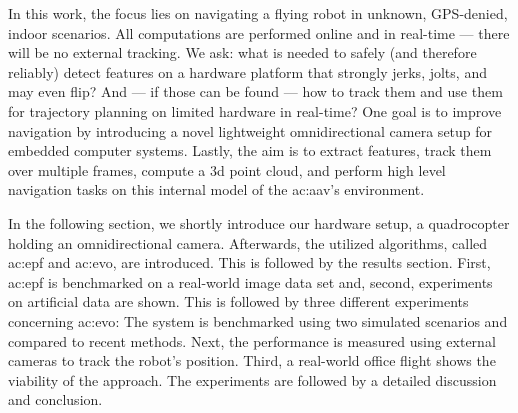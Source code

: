 In this work, the focus lies on navigating a flying robot in unknown, GPS-denied, indoor scenarios.
All computations are performed online and in real-time --- there will be no external tracking.
We ask: what is needed to safely (and therefore reliably) detect features on a hardware platform that strongly jerks, jolts, and may even flip?
And --- if those can be found --- how to track them and use them for trajectory planning on limited hardware in real-time?
One goal is to improve navigation by introducing a novel lightweight omnidirectional camera setup for embedded computer systems.
Lastly, the aim is to extract features, track them over multiple frames, compute a 3d point cloud, and perform high level navigation tasks on this internal model of the \gls{ac:aav}'s environment.

In the following section, we shortly introduce our hardware setup, a quadrocopter holding an omnidirectional camera.
Afterwards, the utilized algorithms, called \gls{ac:epf} and \gls{ac:evo}, are introduced.
This is followed by the results section.
First, \gls{ac:epf} is benchmarked on a real-world image data set and, second, experiments on artificial data are shown.
This is followed by three different experiments concerning \gls{ac:evo}: The system is benchmarked using two simulated scenarios and compared to recent methods.
Next, the performance is measured using external cameras to track the robot's position.
Third, a real-world office flight shows the viability of the approach.
The experiments are followed by a detailed discussion and conclusion.
